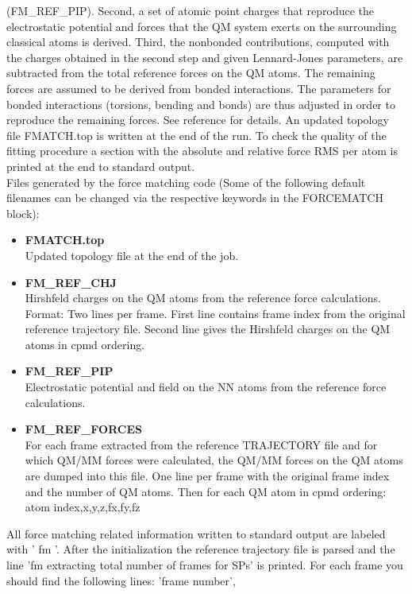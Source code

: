 \documentclass[twoside,10pt,titlepage,a4paper]{article}
\begin{document}
(FM\_REF\_PIP). Second, a set of atomic point charges that reproduce the electrostatic potential and
forces that the QM system exerts on the surrounding classical atoms is derived. Third, the nonbonded
contributions, computed with the charges obtained in the second step and given Lennard-Jones
parameters, are subtracted from the total reference forces on the QM atoms. The remaining forces are
assumed to be derived from bonded interactions. The parameters for bonded interactions (torsions,
bending and bonds) are thus adjusted in order to reproduce the remaining forces. See reference
\cite{FM-maurer} for details. An updated topology file FMATCH.top is written at the end of the run.
To check the quality of the fitting procedure a section with the absolute and relative force RMS per
atom is printed at the end to standard output. \\ Files generated by the force matching code (Some
of the following default filenames can be changed via the respective keywords in the FORCEMATCH
block):
\begin{itemize}
\item \textbf{FMATCH.top} \\
      Updated topology file at the end of the job.
\item \textbf{FM\_REF\_CHJ} \\
      Hirshfeld charges on the QM atoms from the reference force calculations. Format: Two lines
per frame. First line contains frame index from the original reference trajectory file. Second line
gives the Hirshfeld charges on the QM atoms in cpmd ordering.  \item \textbf{FM\_REF\_PIP} \\
      Electrostatic potential and field on the NN atoms from the reference force calculations.
\item \textbf{FM\_REF\_FORCES} \\            
      For each frame extracted from the reference TRAJECTORY file and for which QM/MM forces were
calculated, the QM/MM forces on the QM atoms are dumped into this file. One line per frame with the
original frame index and the number of QM atoms. Then for each QM atom in cpmd ordering:\\ atom
index,x,y,z,fx,fy,fz            
\end{itemize}
All force matching related information written to standard output are labeled with '  fm '. After
the initialization the reference trajectory file is parsed and the line 'fm extracting total number
of frames for SPs' is printed. For each frame you should find the following lines: 'frame number',
\end{document}

